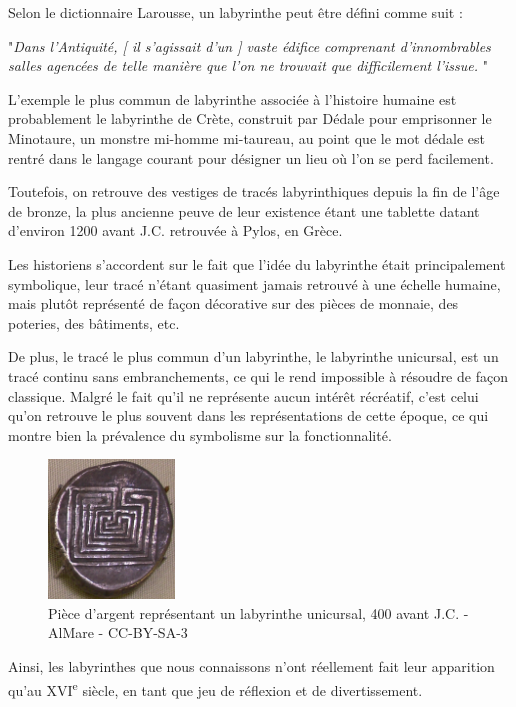 \documentclass[12pt]{scrreprt} %
\begin{document}
Selon le dictionnaire Larousse, un labyrinthe peut être défini comme suit :

"\textit{Dans l'Antiquité, [ il s'agissait d'un ] vaste édifice comprenant d'innombrables salles agencées de telle manière que l'on ne trouvait que difficilement l'issue.} \cite{LabyrintheLarousse}"

L'exemple le plus commun de labyrinthe associée à l'histoire humaine est probablement le labyrinthe de Crète, construit par Dédale pour emprisonner le Minotaure, un monstre mi-homme mi-taureau, au point que le mot dédale est rentré dans le langage courant pour désigner un lieu où l'on se perd facilement.

Toutefois, on retrouve des vestiges de tracés labyrinthiques depuis la fin de l'âge de bronze, la plus ancienne peuve de leur existence étant une tablette datant d'environ 1200 avant J.C. retrouvée à Pylos, en Grèce.\cite{Kern2000}

Les historiens s'accordent sur le fait que l'idée du labyrinthe était principalement symbolique, leur tracé n'étant quasiment jamais retrouvé à une échelle humaine, mais plutôt représenté de façon décorative sur des pièces de monnaie, des poteries, des bâtiments, etc.

De plus, le tracé le plus commun d'un labyrinthe, le labyrinthe unicursal, est un tracé continu sans embranchements, ce qui le rend impossible à résoudre de façon classique. Malgré le fait qu'il ne représente aucun intérêt récréatif, c'est celui qu'on retrouve le plus souvent dans les représentations de cette époque, ce qui montre bien la prévalence du symbolisme sur la fonctionnalité.

\begin{figure}[h]
    \centering
    \includegraphics[width=0.3\textwidth]{images/pieceknossos.jpeg}
    \caption{Pièce d'argent représentant un labyrinthe unicursal, 400 avant J.C. - AlMare - CC-BY-SA-3}
\end{figure}

Ainsi, les labyrinthes que nous connaissons n'ont réellement fait leur apparition qu'au XVI\textsuperscript{e} siècle\cite{McCullough2004}, en tant que jeu de réflexion et de divertissement.
\end{document}
